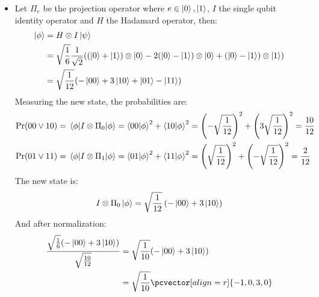 \begin{itemize}
\begin{align*}
    \end{align*}
    \item[d)] Let $\Pi_e$ be the projection operator where $e\in{\ket{0},\ket{1}}$, $I$ the single qubit identity operator and $H$ the Hadamard operator, then:
    \begin{align*}
        \ket{\phi}
        &= H\otimes I\ket{\psi}\\
        &= \sqrt{\frac{1}{6}}\frac{1}{\sqrt{2}}((\ket{0}+\ket{1})\otimes\ket{0} - 2(\ket{0}-\ket{1})\otimes\ket{0} + (\ket{0}-\ket{1})\otimes\ket{1})\\
        &= \sqrt{\frac{1}{12}}(-\ket{00} + 3\ket{10} + \ket{01} - \ket{11})\\
    \end{align*}
    Measuring the new state, the probabilities are:
    \begin{align*}
        \Pr(00\vee10) &= \expval{I\otimes\Pi_0}{\phi} = \braket{00}{\phi}^2 + \braket{10}{\phi}^2= \left(-\sqrt{\frac{1}{12}}\right)^2 + \left(3\sqrt{\frac{1}{12}}\right)^2= \frac{10}{12}\\
        \Pr(01\vee11) &= \expval{I\otimes\Pi_1}{\phi} = \braket{01}{\phi}^2 + \braket{11}{\phi}^2= \left(\sqrt{\frac{1}{12}}\right)^2 + \left(-\sqrt{\frac{1}{12}}\right)^2 = \frac{2}{12}\\
    \end{align*}
    The new state is:
    \begin{align*}
        I\otimes\Pi_0\ket{\phi} =  \sqrt{\frac{1}{12}}\left(-\ket{00} + 3\ket{10}\right)
    \end{align*}
    And after normalization:
    \begin{align*}
        \frac{\sqrt{\frac{1}{6}}(-\ket{00}+3\ket{10})}{\sqrt{\frac{10}{12}}}
        &=  \sqrt{\frac{1}{10}}(-\ket{00}+3\ket{10})\\
        &= \sqrt{\frac{1}{10}}\pcvector[align=r]{-1,0,3,0}
    \end{align*}
\end{itemize}